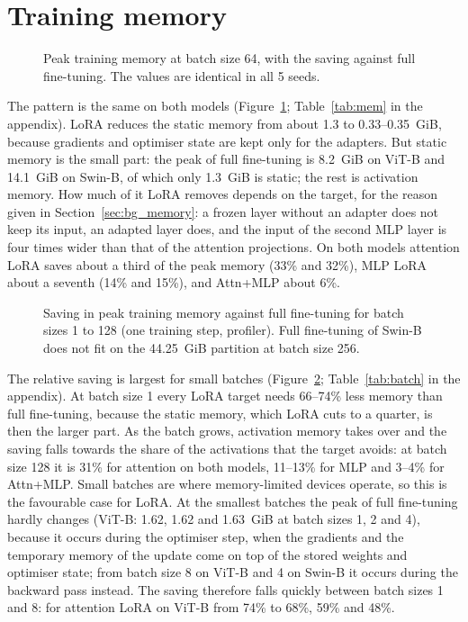 \section{Training memory}
\label{sec:mem}

\begin{figure}[!htb]
\centering

\caption{Peak training memory at batch size 64, with the saving against full fine-tuning. The values are
identical in all 5 seeds.}
\label{fig:mem_targets}
\end{figure}

The pattern is the same on both models (Figure~\ref{fig:mem_targets}; Table~\ref{tab:mem} in the appendix). LoRA
reduces the static memory from about 1.3 to 0.33--0.35~GiB, because gradients and optimiser state are kept only for
the adapters. But static memory is the small part: the peak of full fine-tuning is 8.2~GiB on ViT-B and 14.1~GiB on Swin-B, of
which only 1.3~GiB is static; the rest is activation memory. How much of it LoRA removes depends on the target, for the reason given in
Section~\ref{sec:bg_memory}: a frozen layer without an adapter does not keep its input, an adapted layer does, and
the input of the second MLP layer is four times wider than that of the attention projections. On both models
attention LoRA saves about a third of the peak memory (33\% and 32\%), MLP LoRA about a seventh (14\% and 15\%), and
Attn+MLP about 6\%.

\begin{figure}[!htb]
\centering

\caption{Saving in peak training memory against full fine-tuning for batch sizes 1 to 128 (one training step,
profiler). Full fine-tuning of Swin-B does not fit on the 44.25~GiB partition at batch size 256.}
\label{fig:saving_batch}
\end{figure}

The relative saving is largest for small batches (Figure~\ref{fig:saving_batch}; Table~\ref{tab:batch} in the
appendix). At batch size 1 every LoRA target needs 66--74\% less memory than full fine-tuning, because the static
memory, which LoRA cuts to a quarter, is then the larger part. As the batch grows, activation memory takes over and
the saving falls towards the share of the activations that the target avoids: at batch size 128 it is 31\% for
attention on both models, 11--13\% for MLP and 3--4\% for Attn+MLP. Small batches are where memory-limited devices
operate, so this is the favourable case for LoRA. At the smallest batches the peak of full fine-tuning hardly
changes (ViT-B: 1.62, 1.62 and 1.63~GiB at batch sizes 1, 2 and 4), because it occurs during the optimiser step,
when the gradients and the temporary memory of the update come on top of the stored weights and optimiser state;
from batch size 8 on ViT-B and 4 on Swin-B it occurs during the backward pass instead. The saving therefore falls
quickly between batch sizes 1 and 8: for attention LoRA on ViT-B from 74\% to 68\%, 59\% and 48\%.

